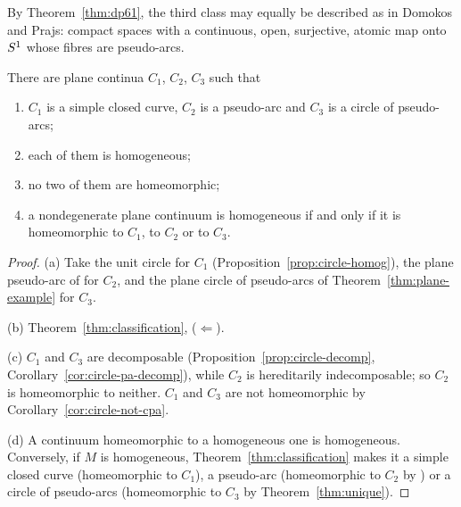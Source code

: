 
By Theorem~\ref{thm:dp61}, the third class may equally be described as in Domokos and Prajs: compact spaces with a continuous, open, surjective, atomic map onto $S^1$ whose fibres are
pseudo-arcs.


\begin{theorem}\label{thm:classification-plane}
There are plane continua $C_1$, $C_2$, $C_3$ such that
\begin{enumerate}[label=(\alph*)]
\item $C_1$ is a simple closed curve, $C_2$ is a pseudo-arc and $C_3$ is a circle of pseudo-arcs;
\item each of them is homogeneous;
\item no two of them are homeomorphic;
\item a nondegenerate plane continuum is homogeneous if and only if it is homeomorphic to $C_1$, to $C_2$ or to $C_3$.
\end{enumerate}
\end{theorem}

\begin{proof}
(a) Take the unit circle for $C_1$ (Proposition~\ref{prop:circle-homog}), the plane pseudo-arc of  for $C_2$, and the plane circle of pseudo-arcs of
Theorem~\ref{thm:plane-example} for $C_3$.

(b) Theorem~\ref{thm:classification}, ($\Leftarrow$).

(c) $C_1$ and $C_3$ are decomposable (Proposition~\ref{prop:circle-decomp}, Corollary~\ref{cor:circle-pa-decomp}), while $C_2$ is hereditarily indecomposable; so $C_2$ is homeomorphic to
neither. $C_1$ and $C_3$ are not homeomorphic by Corollary~\ref{cor:circle-not-cpa}.

(d) A continuum homeomorphic to a homogeneous one is homogeneous. Conversely, if $M$ is homogeneous, Theorem~\ref{thm:classification} makes it a simple closed curve (homeomorphic to $C_1$), a
pseudo-arc (homeomorphic to $C_2$ by ) or a circle of pseudo-arcs (homeomorphic to $C_3$ by Theorem~\ref{thm:unique}).
\end{proof}



